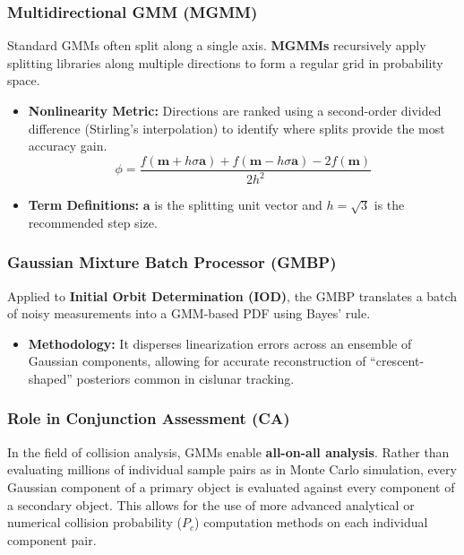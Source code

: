 \documentclass[
  letterpaper,
  DIV=11,
  numbers=noendperiod,
  oneside]{scrartcl}
\providecommand{\tightlist}{%
  \setlength{\itemsep}{0pt}\setlength{\parskip}{0pt}}
\begin{document}
\subsubsection{Multidirectional GMM
(MGMM)}\label{multidirectional-gmm-mgmm}

Standard GMMs often split along a single axis. \textbf{MGMMs}
recursively apply splitting libraries along multiple directions to form
a regular grid in probability space.

\begin{itemize}
\item
  \textbf{Nonlinearity Metric:} Directions are ranked using a
  second-order divided difference (Stirling's interpolation) to identify
  where splits provide the most accuracy gain. \[
  \phi = \frac{f(\mathbf{m} + h\sigma \mathbf{a}) + f(\mathbf{m} - h\sigma \mathbf{a}) - 2f(\mathbf{m})}{2h^2}
  \]
\item
  \textbf{Term Definitions:} \(\mathbf{a}\) is the splitting unit vector
  and \(h = \sqrt{3}\) is the recommended step size.
\end{itemize}

\subsubsection{Gaussian Mixture Batch Processor
(GMBP)}\label{gaussian-mixture-batch-processor-gmbp}

Applied to \textbf{Initial Orbit Determination (IOD)}, the GMBP
translates a batch of noisy measurements into a GMM-based PDF using
Bayes' rule.

\begin{itemize}
\tightlist
\item
  \textbf{Methodology:} It disperses linearization errors across an
  ensemble of Gaussian components, allowing for accurate reconstruction
  of ``crescent-shaped'' posteriors common in cislunar tracking.
\end{itemize}

\subsubsection{Role in Conjunction Assessment
(CA)}\label{role-in-conjunction-assessment-ca}

In the field of collision analysis, GMMs enable \textbf{all-on-all
analysis}. Rather than evaluating millions of individual sample pairs as
in Monte Carlo simulation, every Gaussian component of a primary object
is evaluated against every component of a secondary object. This allows
for the use of more advanced analytical or numerical collision
probability (\(P_c\)) computation methods on each individual component
pair.
\end{document}
